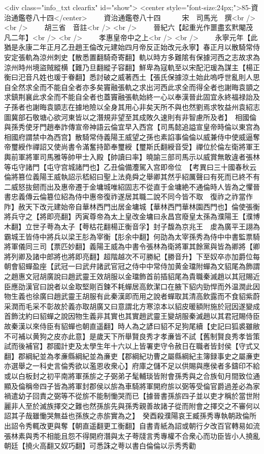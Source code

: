 <div class="info_txt clearfix" id="show">
<center style="font-size:24px;">85-資治通鑑卷八十四</center>
  　　資治通鑑卷八十四　　　宋　司馬光　撰<br />
<br />
　　胡三省　音註<br />
<br />
　　晉紀六【起重光作噩盡玄黓閹茂凡二年】<br />
<br />
　　孝惠皇帝中之上<br />
<br />
　　永寧元年【此猶是永康二年正月乙丑趙王倫改元建始四月帝反正始改元永寧】春正月以散騎常侍安定張軌為涼州刺史【散悉置翻騎奇寄翻】軌以時方多難隂有保據河西之志故求為涼州時州境盜賊縱横【難乃旦翻縱子容翻】鮮卑為寇軌至以宋配汜瑗為謀主【楊正衡曰汜音凡姓也瑗于眷翻】悉討破之威著西土【張氏保據涼土始此嗚呼世亂則人思自全然求全而不能自全者亦多矣竇融張軌之求出河西此求全而得全者也謝晦袁顗之求鎮荆襄此求全而不能自全者也蓋竇融張軌始終一心以奉漢晉此固宜永終福禄詒及子孫者也謝晦袁顗志在據地險以全身其用心非矣天所不與也然劉焉求牧益州袁紹志圖冀部石敬塘心欲河東皆以之潛規非望至其成敗久速則有非智慮所及者】　相國倫與孫秀使牙門趙奉詐傳宣帝神語云倫宜早入西宫【司馬懿追謚宣皇帝時倫以東宫為相國府謂禁中為西宫】散騎常侍義陽王威望之孫也素諂事倫倫以威兼侍中使威逼奪帝璽綬作禪詔又使尚書令滿奮持節奉璽綬【璽斯氏翻綬音受】禪位於倫左衛將軍王輿前軍將軍司馬雅等帥甲士入殿【帥讀曰率】曉諭三部司馬示以威賞無敢違者張林等屯守諸門【屯守宫城諸門也】乙丑倫備灋駕入宫即帝位　【考異曰三十國春秋云倫將篡位義陽王威執詔示嵇紹曰聖上法堯舜之舉卿其然乎紹厲聲曰有死而已終不有二威怒抜劒而出及惠帝遷于金墉城唯紹固志不從直于金墉絶不通倫時人皆為之懼晉書忠義傳云倫簒位紹為侍中惠帝復祚遂居其職二說不同今皆不取　復祚之祚當作阼】赦天下改元建始帝自華林西門出居金墉城【華林西門華林園西門也】倫使張衡將兵守之【將即亮翻】丙寅尊帝為太上皇改金墉曰永昌宫廢皇太孫為濮陽王【濮博木翻】立世子荂為太子【荂枯花翻楊正衡音孚】封子馥為京兆王　䖍為廣平王詡為霸城王皆侍中將兵以梁王肜為宰衡【肜余中翻】何劭為太宰孫秀為侍中中書監票騎將軍儀同三司【票匹妙翻】義陽王威為中書令張林為衛將軍其餘黨與皆為卿將【卿將列卿及諸中郎將也將即亮翻】超階越次不可勝紀【勝音升】下至奴卒亦加爵位每朝會貂蟬盈座【武冠一曰武弁諸武官冠之侍中中常侍加黄金璫附蟬為文貂尾為飾謂之趙惠文冠胡廣說曰趙武靈王效胡服以金璫飾首前插貂尾為貴職秦滅趙以其冠賜近臣應劭漢官曰說者以金取堅剛百鍊不耗蟬居高飲潔口在腋下貂内勁悍而外温潤此因物生義也徐廣曰趙武靈王胡服有此秦漢即而用之說者蟬取其清高飲露而不食貂紫蔚采潤而毛采不彰故於義亦取胡廣又曰意謂北方寒涼本以貂皮暖額附施於冠因遂變成首飾沈約曰貂蟬之說因物生義非其實也其實趙武靈王變胡服秦滅趙以其君冠賜侍臣故秦漢以來侍臣有貂蟬也朝直遥翻】時人為之諺曰貂不足狗尾續【史記曰狐裘雖敝不可補以黄狗之皮亦此意】是歲天下所舉賢良秀才孝亷皆不試【舊制賢良秀孝皆策試而後補官】郡國計吏及太學生年十六以上皆署吏守令赦日在職者皆封侯【守式又翻】郡綱紀並為孝亷縣綱紀並為亷吏【郡綱紀功曹之屬縣綱紀主簿録事史之屬亷吏亦選舉之一科史言倫秀欲以濫恩收衆心】府庫之儲不足以供賜與應侯者多鑄印不給或以白板封之初平南將軍孫旂之子弼弟子髦輔琰皆附會孫秀與之合族旬月間致位通顯及倫稱帝四子皆為將軍封郡侯以旂為車騎將軍開府旂以弼等受倫官爵過差必為家禍遣幼子回責之弼等不從旂不能制慟哭而已【據晉書孫旂四子並以吏才稱於當世附麗非人至於滅族擇交之難也然孫旂先與孫秀親善故諸子從而附會之擇交之不審何以詔其子哉雖慟哭無益也孫族之赤旂實為之】　癸酉殺濮陽哀王臧孫秀專執朝政倫所出詔令秀輒改更與奪【朝直遥翻更工衡翻】自書青紙為詔或朝行夕改百官轉易如流張林素與秀不相能且怨不得開府潛與太子荂牋言秀專權不合衆心而功臣皆小人撓亂朝廷【撓火高翻又奴巧翻】可悉誅之荂以書白倫倫以示秀秀勸